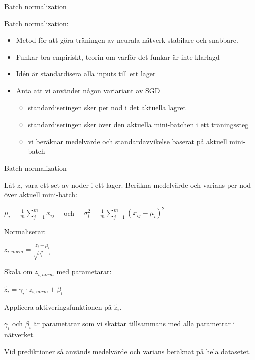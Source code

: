 \documentclass[10pt,english]{beamer}
\begin{document}
\begin{frame}{Batch normalization}

\href{https://en.wikipedia.org/wiki/Batch_normalization}{Batch normalization}:
  \begin{itemize}
    \item Metod för att göra träningen av neurala nätverk stabilare och snabbare.
    \item Funkar bra empiriskt, teorin om varför det funkar är inte klarlagd 
    \item Idén är standardisera alla inputs till ett lager
    \item Anta att vi använder någon variariant av SGD
    \begin{itemize}
      \item standardiseringen sker per nod i det aktuella lagret
      \item standardiseringen sker över den aktuella mini-batchen i ett träningssteg
      \item vi beräknar medelvärde och standardavvikelse baserat på aktuell mini-batch
    \end{itemize}
    
  \end{itemize}
   
    
\end{frame}


\begin{frame}{Batch normalization}

Låt $z_i$ vara ett set av noder i ett lager. Beräkna medelvärde och varians per nod över aktuell mini-batch:

$\mu_i = \frac{1}{m} \sum_{j=1}^m x_{ij} \quad$ och $\quad \sigma_{i}^2 = \frac{1}{m} \sum_{j=1}^m (x_{ij}-\mu_i)^2$

Normaliserar: 

$z_{i,norm}=\frac{z_i-\mu_i}{\sqrt{ \sigma_{i}^2 + \epsilon}}$

Skala om $z_{i,norm}$ med parametarar:

$\tilde{z_{i}} = \gamma_i \cdot z_{i,norm} + \beta_i$

Applicera aktiveringsfunktionen på $\tilde{z_{i}}$. 

$\gamma_i$ och  $\beta_i$ är parametarar som vi skattar tillsammans med alla parametrar i nätverket. 

Vid prediktioner så används medelvärde och varians beräknat på hela datasetet.

   
    
\end{frame}
\end{document}

